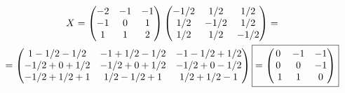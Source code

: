 \documentclass[a4paper]{article}
\theoremstyle{definition}
\theoremstyle{plain}
\begin{document}
\begin{multline*}
  X =
  \begin{pmatrix}
    -2 & -1 & -1\\
    -1 & 0 & 1\\
    1 & 1 & 2
  \end{pmatrix}
  \begin{pmatrix}
    -1/2 & 1/2 & 1/2\\
    1/2 & -1/2 & 1/2\\
    1/2 & 1/2 & -1/2
  \end{pmatrix}
  =\\
  =
  \begin{pmatrix}
    1 - 1/2 - 1/2 & -1 + 1/2 - 1/2 & -1 - 1/2 + 1/2\\
    -1/2 + 0 + 1/2 & -1/2 + 0 + 1/2 & -1/2 + 0 - 1/2\\
    -1/2 + 1/2 + 1 & 1/2 - 1/2 + 1 & 1/2 + 1/2 - 1
  \end{pmatrix}
  \fbox{$=
    \begin{pmatrix} 0 & -1 & -1\\
      0 & 0 & -1\\\
      1 & 1 & 0
    \end{pmatrix}$}
\end{multline*}
\end{document}
